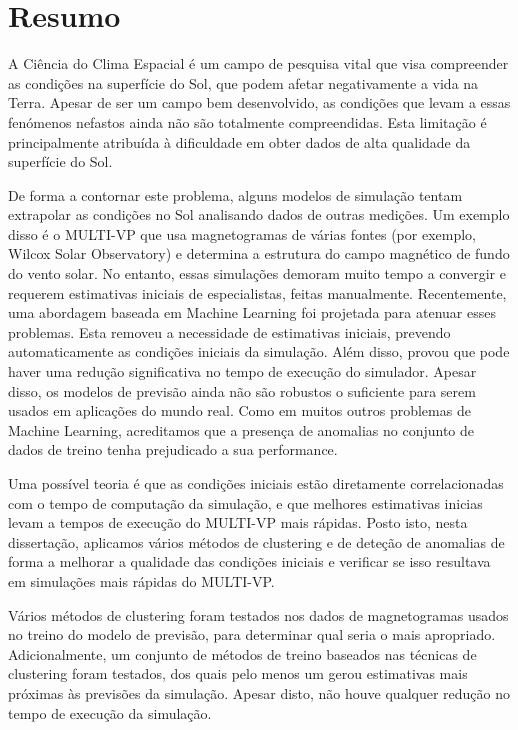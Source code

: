 \chapter*{Resumo}

A Ciência do Clima Espacial é um campo de pesquisa vital que visa compreender as condições na superfície do Sol, que podem afetar negativamente a vida na Terra. Apesar de ser um campo bem desenvolvido, as condições que levam a essas fenómenos nefastos ainda não são totalmente compreendidas. Esta limitação é principalmente atribuída à dificuldade em obter dados de alta qualidade da superfície do Sol.

De forma a contornar este problema, alguns modelos de simulação tentam extrapolar as condições no Sol analisando dados de outras medições. Um exemplo disso é o MULTI-VP que usa magnetogramas de várias fontes (por exemplo, Wilcox Solar Observatory) e determina a estrutura do campo magnético de fundo do vento solar. No entanto, essas simulações demoram muito tempo a convergir e requerem estimativas iniciais de especialistas, feitas manualmente. Recentemente, uma abordagem baseada em Machine Learning foi projetada para atenuar esses problemas. Esta removeu a necessidade de estimativas iniciais, prevendo automaticamente as condições iniciais da simulação. Além disso, provou que pode haver uma redução significativa no tempo de execução do simulador. Apesar disso, os modelos de previsão ainda não são robustos o suficiente para serem usados em aplicações do mundo real. Como em muitos outros problemas de Machine Learning, acreditamos que a presença de anomalias no conjunto de dados de treino tenha prejudicado a sua performance.

Uma possível teoria é que as condições iniciais estão diretamente correlacionadas com o tempo de computação da simulação, e que melhores estimativas inicias levam a tempos de execução do MULTI-VP mais rápidas. Posto isto, nesta dissertação, aplicamos vários métodos de clustering e de deteção de anomalias de forma a melhorar a qualidade das condições iniciais e verificar se isso resultava em simulações mais rápidas do MULTI-VP.

Vários métodos de clustering foram testados nos dados de magnetogramas usados no treino do modelo de previsão, para determinar qual seria o mais apropriado. Adicionalmente, um conjunto de métodos de treino baseados nas técnicas de clustering foram testados, dos quais pelo menos um gerou estimativas mais próximas às previsões da simulação. Apesar disto, não houve qualquer redução no tempo de execução da simulação.

